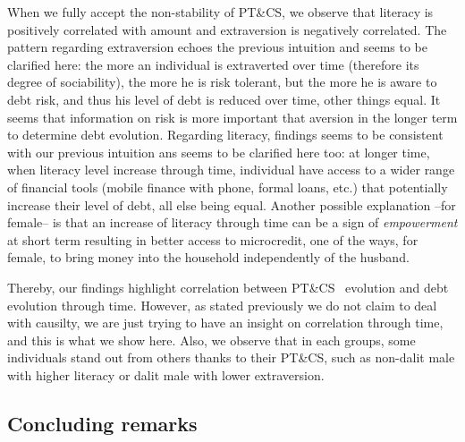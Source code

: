 \documentclass[a4paper, 11pt, onecolumn]{article}
\newcommand{\aebe}{all else being equal}
\newcommand{\ote}{other things equal}
\newcommand{\PTCS}{PT\&CS}
\begin{document}
When we fully accept the non-stability of \PTCS, we observe that literacy is positively correlated with amount and extraversion is negatively correlated.
The pattern regarding extraversion echoes the previous intuition and seems to be clarified here: the more an individual is extraverted over time (therefore its degree of sociability), the more he is risk tolerant, but the more he is aware to debt risk, and thus his level of debt is reduced over time, \ote.
It seems that information on risk is more important that aversion in the longer term to determine debt evolution.
Regarding literacy, findings seems to be consistent with our previous intuition ans seems to be clarified here too: at longer time, when literacy level increase through time, individual have access to a wider range of financial tools (mobile finance with phone, formal loans, etc.) that potentially increase their level of debt, \aebe.
Another possible explanation --for female-- is that an increase of literacy through time can be a sign of \textit{empowerment} at short term resulting in better access to microcredit, one of the ways, for female, to bring money into the household independently of the husband.

Thereby, our findings highlight correlation between \PTCS~ evolution and debt evolution through time.
However, as stated previously we do not claim to deal with causilty, we are just trying to have an insight on correlation through time, and this is what we show here.
Also, we observe that in each groups, some individuals stand out from others thanks to their \PTCS, such as non-dalit male with higher literacy or dalit male with lower extraversion.



	\subsection{Concluding remarks}
\end{document}
